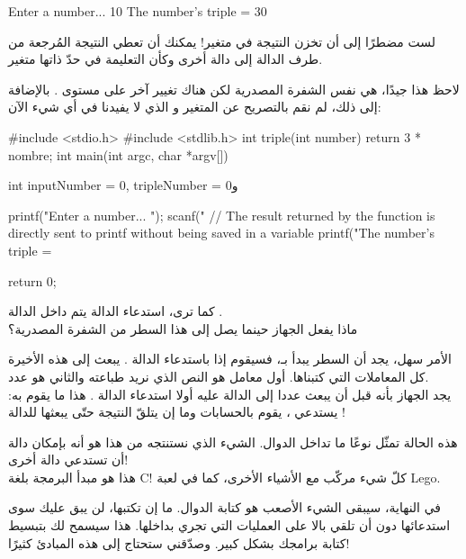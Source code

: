 \begin{Console}
Enter a number... 10
The number's triple = 30
\end{Console}

\begin{information}
لست مضطرًا إلى أن تخزن النتيجة في متغير! يمكنك أن تعطي النتيجة المُرجعة من طرف الدالة 
إلى دالة أخرى وكأن التعليمة
في حدّ ذاتها متغير.
\end{information}
لاحظ هذا جيدًا، هي نفس الشفرة المصدرية لكن هناك تغيير آخر على مستوى 
.
بالإضافة إلى ذلك، لم نقم بالتصريح عن المتغير 
و الذي لا يفيدنا في أي شيء الآن:

\begin{Csource}
#include <stdio.h>
#include <stdlib.h>
int triple(int number)
{
	return 3 * nombre;
}
int main(int argc, char *argv[])
{
	int inputNumber = 0, tripleNumber = 0و
	
	printf("Enter a number... ");
	scanf("%
	// The result returned by the function is directly sent to printf without being saved in a variable
	printf("The number's triple = %
	
	return 0;
}
\end{Csource}

كما ترى، استدعاء الدالة 
يتم داخل الدالة 
.\\
ماذا يفعل الجهاز حينما يصل إلى هذا السطر من الشفرة المصدرية؟

الأمر سهل، يجد أن السطر يبدأ بـ،
فسيقوم إذا باستدعاء الدالة 
.
يبعث إلى هذه الأخيرة كل المعاملات التي كتبناها. أول معامل هو النص الذي نريد طباعته والثاني هو عدد.\\
يجد الجهاز بأنه قبل أن يبعث عددا إلى الدالة 
عليه أولا استدعاء الدالة 
.
هذا ما يقوم به: يستدعي 
،
يقوم بالحسابات وما إن يتلقّ النتيجة حتّى يبعثها للدالة 
!

هذه الحالة تمثّل نوعًا ما تداخل الدوال. الشيء الذي نستنتجه من هذا هو أنه بإمكان دالة أن تستدعي دالة أخرى!\\
هذا هو مبدأ البرمجة بلغة
\textenglish{C}!
كلّ شيء مركّب مع الأشياء الأخرى، كما في لعبة
\textenglish{Lego}.

في النهاية، سيبقى الشيء الأصعب هو كتابة الدوال. ما إن تكتبها، لن يبق عليك سوى استدعائها دون أن تلقي بالا على العمليات التي تجري بداخلها. هذا سيسمح لك بتبسيط كتابة برامجك بشكل كبير. وصدّقني ستحتاج إلى هذه المبادئ كثيرًا!

